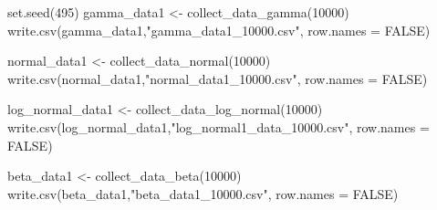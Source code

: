 \documentclass[12pt]{article}
\newenvironment{Shaded}{\begin{snugshade}}{\end{snugshade}}
\newcommand{\AttributeTok}[1]{\textcolor[rgb]{0.77,0.63,0.00}{#1}}
\newcommand{\ConstantTok}[1]{\textcolor[rgb]{0.00,0.00,0.00}{#1}}
\newcommand{\DecValTok}[1]{\textcolor[rgb]{0.00,0.00,0.81}{#1}}
\newcommand{\FunctionTok}[1]{\textcolor[rgb]{0.00,0.00,0.00}{#1}}
\newcommand{\NormalTok}[1]{#1}
\newcommand{\OtherTok}[1]{\textcolor[rgb]{0.56,0.35,0.01}{#1}}
\newcommand{\StringTok}[1]{\textcolor[rgb]{0.31,0.60,0.02}{#1}}
\begin{document}
\begin{Shaded}
\begin{Highlighting}[]
\FunctionTok{set.seed}\NormalTok{(}\DecValTok{495}\NormalTok{)}
\NormalTok{gamma\_data1 }\OtherTok{\textless{}{-}} \FunctionTok{collect\_data\_gamma}\NormalTok{(}\DecValTok{10000}\NormalTok{)}
\FunctionTok{write.csv}\NormalTok{(gamma\_data1,}\StringTok{"gamma\_data1\_10000.csv"}\NormalTok{, }\AttributeTok{row.names =} \ConstantTok{FALSE}\NormalTok{)}

\NormalTok{normal\_data1 }\OtherTok{\textless{}{-}} \FunctionTok{collect\_data\_normal}\NormalTok{(}\DecValTok{10000}\NormalTok{)}
\FunctionTok{write.csv}\NormalTok{(normal\_data1,}\StringTok{"normal\_data1\_10000.csv"}\NormalTok{, }\AttributeTok{row.names =} \ConstantTok{FALSE}\NormalTok{)}

\NormalTok{log\_normal\_data1 }\OtherTok{\textless{}{-}} \FunctionTok{collect\_data\_log\_normal}\NormalTok{(}\DecValTok{10000}\NormalTok{)}
\FunctionTok{write.csv}\NormalTok{(log\_normal\_data1,}\StringTok{"log\_normal1\_data\_10000.csv"}\NormalTok{, }\AttributeTok{row.names =} \ConstantTok{FALSE}\NormalTok{)}

\NormalTok{beta\_data1 }\OtherTok{\textless{}{-}} \FunctionTok{collect\_data\_beta}\NormalTok{(}\DecValTok{10000}\NormalTok{)}
\FunctionTok{write.csv}\NormalTok{(beta\_data1,}\StringTok{"beta\_data1\_10000.csv"}\NormalTok{, }\AttributeTok{row.names =} \ConstantTok{FALSE}\NormalTok{)}
\end{Highlighting}
\end{Shaded}
\end{document}
